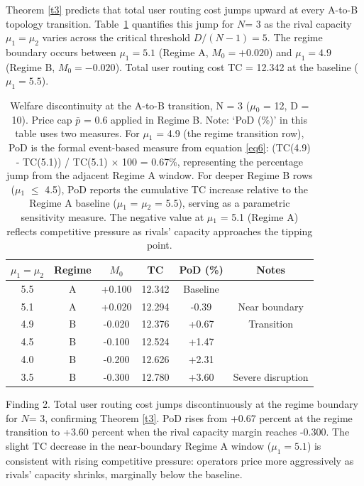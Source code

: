 \documentclass[review,3p,authoryear]{elsarticle}
\begin{document}
Theorem \ref{t3} predicts that total user routing cost jumps upward at every A-to-B topology transition. Table~\ref{tab2} quantifies this jump for $N$= 3 as the rival capacity ${\mu}_{1} = {\mu}_{2}$ varies across the critical threshold $D/(N-1) = 5$. The regime boundary occurs between ${\mu}_{1} = 5.1$ (Regime A, $M_{0} = +0.020$) and ${\mu}_{1} = 4.9$ (Regime B, $M_{0} = -0.020$). Total user routing cost TC = 12.342 at the baseline (${\mu}_{1} = 5.5$).

\begin{table}[!ht]
\centering
\caption{Welfare discontinuity at the A-to-B transition, N = 3 (\ensuremath{\mu}\ensuremath{_{0}} = 12, D = 10). Price cap \ensuremath{\bar{p}} = 0.6 applied in Regime B. Note: `PoD (\%)' in this table uses two measures. For \ensuremath{\mu}\ensuremath{_{1}} = 4.9 (the regime transition row), PoD is the formal event-based measure from equation \ref{eq6}: (TC(4.9) - TC(5.1)) / TC(5.1) \ensuremath{\times} 100 = 0.67\%, representing the percentage jump from the adjacent Regime A window. For deeper Regime B rows (\ensuremath{\mu}\ensuremath{_{1}} \ensuremath{\le} 4.5), PoD reports the cumulative TC increase relative to the Regime A baseline (\ensuremath{\mu}\ensuremath{_{1}} = \ensuremath{\mu}\ensuremath{_{2}} = 5.5), serving as a parametric sensitivity measure. The negative value at \ensuremath{\mu}\ensuremath{_{1}} = 5.1 (Regime A) reflects competitive pressure as rivals' capacity approaches the tipping point.
}
\label{tab2}
\begin{tabular}{@{}cccccc@{}}
\toprule
$\mu_1 = \mu_2$ & Regime & $M_0$  & TC     & PoD (\%) & Notes             \\ \midrule
5.5             & A      & +0.100 & 12.342 & Baseline &                   \\
5.1             & A      & +0.020 & 12.294 & -0.39    & Near boundary     \\
4.9             & B      & -0.020 & 12.376 & +0.67    & Transition        \\
4.5             & B      & -0.100 & 12.524 & +1.47    &                   \\
4.0             & B      & -0.200 & 12.626 & +2.31    &                   \\
3.5             & B      & -0.300 & 12.780 & +3.60    & Severe disruption \\ \bottomrule
\end{tabular}
\end{table}

Finding 2. Total user routing cost jumps discontinuously at the regime boundary for $N$= 3, confirming Theorem \ref{t3}. PoD rises from +0.67 percent at the regime transition to +3.60 percent when the rival capacity margin reaches -0.300. The slight TC decrease in the near-boundary Regime A window (${\mu}_{1} = 5.1$) is consistent with rising competitive pressure: operators price more aggressively as rivals' capacity shrinks, marginally below the baseline.
\end{document}
